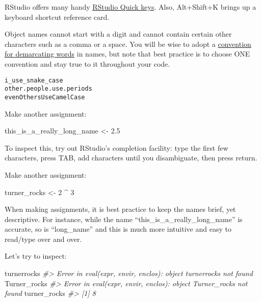 \documentclass[
]{book}
\newenvironment{Shaded}{\begin{snugshade}}{\end{snugshade}}
\newcommand{\CommentTok}[1]{\textcolor[rgb]{0.56,0.35,0.01}{\textit{#1}}}
\newcommand{\DecValTok}[1]{\textcolor[rgb]{0.00,0.00,0.81}{#1}}
\newcommand{\FloatTok}[1]{\textcolor[rgb]{0.00,0.00,0.81}{#1}}
\newcommand{\NormalTok}[1]{#1}
\newcommand{\OtherTok}[1]{\textcolor[rgb]{0.56,0.35,0.01}{#1}}
\newcommand{\SpecialCharTok}[1]{\textcolor[rgb]{0.00,0.00,0.00}{#1}}
\begin{document}
RStudio offers many handy \href{https://support.rstudio.com/hc/en-us/articles/200711853-Keyboard-Shortcuts-in-the-RStudio-IDE}{RStudio Quick keys}. Also, Alt+Shift+K brings up a keyboard shortcut reference card.

Object names cannot start with a digit and cannot contain certain other characters such as a comma or a space. You will be wise to adopt a \href{https://en.wikipedia.org/wiki/Snake_case}{convention for demarcating words} in names, but note that best practice is to choose ONE convention and stay true to it throughout your code.

\begin{verbatim}
i_use_snake_case
other.people.use.periods
evenOthersUseCamelCase
\end{verbatim}

Make another assignment:

\begin{Shaded}
\begin{Highlighting}[]
\NormalTok{this\_is\_a\_really\_long\_name }\OtherTok{\textless{}{-}} \FloatTok{2.5}
\end{Highlighting}
\end{Shaded}

To inspect this, try out RStudio's completion facility: type the first few characters, press TAB, add characters until you disambiguate, then press return.

Make another assignment:

\begin{Shaded}
\begin{Highlighting}[]
\NormalTok{turner\_rocks }\OtherTok{\textless{}{-}} \DecValTok{2} \SpecialCharTok{\^{}} \DecValTok{3}
\end{Highlighting}
\end{Shaded}

When making assignments, it is best practice to keep the names brief, yet descriptive. For instance, while the name ``this\_is\_a\_really\_long\_name'' is accurate, so is ``long\_name'' and this is much more intuitive and easy to read/type over and over.

Let's try to inspect:

\begin{Shaded}
\begin{Highlighting}[]
\NormalTok{turnerrocks}
\CommentTok{\#\textgreater{} Error in eval(expr, envir, enclos): object \textquotesingle{}turnerrocks\textquotesingle{} not found}
\NormalTok{Turner\_rocks}
\CommentTok{\#\textgreater{} Error in eval(expr, envir, enclos): object \textquotesingle{}Turner\_rocks\textquotesingle{} not found}
\NormalTok{turner\_rocks}
\CommentTok{\#\textgreater{} [1] 8}
\end{Highlighting}
\end{Shaded}
\end{document}

